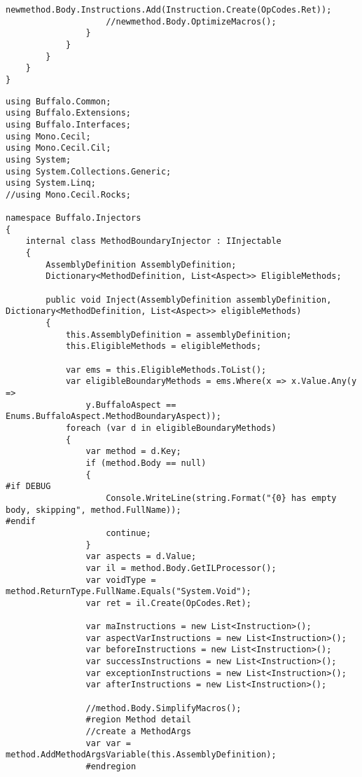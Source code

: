 \begin{lstlisting}[caption={../buffalo/Injectors/MethodAroundInjector.cs}, label=../buffalo/Injectors/MethodAroundInjector.cs, frame=tb, basicstyle=\scriptsize]
                    newmethod.Body.Instructions.Add(Instruction.Create(OpCodes.Ret));
                    //newmethod.Body.OptimizeMacros();
                }
            }
        }
    }
}
\end{lstlisting}

\begin{lstlisting}[caption={../buffalo/Injectors/MethodBoundaryInjector.cs}, label=../buffalo/Injectors/MethodBoundaryInjector.cs, frame=tb, basicstyle=\scriptsize]﻿using Buffalo.Common;
using Buffalo.Extensions;
using Buffalo.Interfaces;
using Mono.Cecil;
using Mono.Cecil.Cil;
using System;
using System.Collections.Generic;
using System.Linq;
//using Mono.Cecil.Rocks;

namespace Buffalo.Injectors
{
    internal class MethodBoundaryInjector : IInjectable
    {
        AssemblyDefinition AssemblyDefinition;
        Dictionary<MethodDefinition, List<Aspect>> EligibleMethods;

        public void Inject(AssemblyDefinition assemblyDefinition, Dictionary<MethodDefinition, List<Aspect>> eligibleMethods)
        {
            this.AssemblyDefinition = assemblyDefinition;
            this.EligibleMethods = eligibleMethods;

            var ems = this.EligibleMethods.ToList();
            var eligibleBoundaryMethods = ems.Where(x => x.Value.Any(y =>
                y.BuffaloAspect == Enums.BuffaloAspect.MethodBoundaryAspect));
            foreach (var d in eligibleBoundaryMethods)
            {
                var method = d.Key;
                if (method.Body == null)
                {
#if DEBUG
                    Console.WriteLine(string.Format("{0} has empty body, skipping", method.FullName));
#endif
                    continue;
                }
                var aspects = d.Value;
                var il = method.Body.GetILProcessor();
                var voidType = method.ReturnType.FullName.Equals("System.Void");
                var ret = il.Create(OpCodes.Ret);

                var maInstructions = new List<Instruction>();
                var aspectVarInstructions = new List<Instruction>();
                var beforeInstructions = new List<Instruction>();
                var successInstructions = new List<Instruction>();
                var exceptionInstructions = new List<Instruction>();
                var afterInstructions = new List<Instruction>();

                //method.Body.SimplifyMacros();
                #region Method detail
                //create a MethodArgs
                var var = method.AddMethodArgsVariable(this.AssemblyDefinition);
                #endregion


\end{lstlisting}
